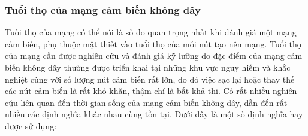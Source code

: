 \documentclass{article}
\begin{document}
\subsubsection{Tuổi thọ của mạng cảm biến không dây}
Tuối thọ của mạng có thể nói là số đo quan trọng nhất khi đánh giá một mạng cảm biến, phụ thuộc mật thiết vào tuổi thọ của mỗi nút tạo nên mạng. Tuổi thọ của mạng cần được nghiên cứu và đánh giá kỹ lưỡng do đặc điểm của mạng cảm biến không dây thường được triển khai tại những khu vực nguy hiểm và khắc nghiệt cùng với số lượng nút cảm biến rất lớn, do đó việc sạc lại hoặc thay thế các nút cảm biến là rất khó khăn, thậm chí là bất khả thi. 
\newline Có rất nhiều nghiên cứu liên quan đến thời gian sống của mạng cảm biến không dây, dẫn đến rất nhiều các định nghĩa khác nhau cùng tồn tại. Dưới đây là một số định nghĩa hay được sử dụng:
\end{document}
